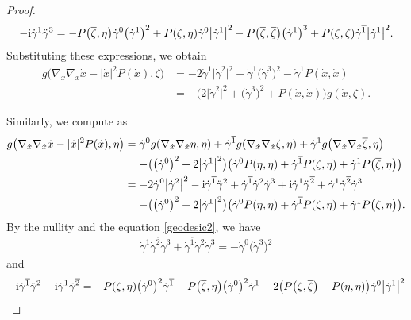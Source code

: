 \documentclass[11pt]{article}
\numberwithin{equation}{section}
\newcommand\ol{\overline}
\numberwithin{equation}{section}
\begin{document}
\begin{proof}
\begin{gather*}
-{\rm i}\dot\gamma^1\ddot\gamma^3=-P\bigl(\ol\zeta, \eta\bigr)\dot\gamma^0\bigl(\dot\gamma^1\bigr)^2+P(\zeta, \eta)\dot\gamma^0\bigl|\dot\gamma^{1}\bigr|^2
-P\bigl(\ol\zeta, \ol\zeta\bigr)\bigl(\dot\gamma^1\bigr)^3+P(\zeta, \zeta)\dot\gamma^{\ol1}\bigl|\dot\gamma^{1}\bigr|^2.
\end{gather*}
Substituting these expressions, we obtain
\begin{align*}
g\bigl(\nabla_{\dot x}\nabla_{\dot x}\dot x-|\dot x|^2P(\dot x) ,\zeta\bigr)
&=-2\dot\gamma^1\bigl|\dot\gamma^2\bigr|^2-\dot\gamma^1\bigl(\dot\gamma^3\bigr)^2-\dot\gamma^1P(\dot x, \dot x) \\
&=-\bigl(2\bigl|\dot\gamma^2\bigr|^2+\bigl(\dot\gamma^3\bigr)^2+P(\dot x, \dot x)\bigr)g(\dot x, \zeta).
\end{align*}

Similarly, we compute as
\begin{align*}
g\bigl(\nabla_{\dot x}\nabla_{\dot x}\dot x-|\dot x|^2P(\dot x) ,\eta\bigr)
={}&\dot\gamma^0g(\nabla_{\dot x}\nabla_{\dot x}\eta, \eta)+
\dot\gamma^{\ol1}g(\nabla_{\dot x}\nabla_{\dot x}\zeta, \eta)+\dot\gamma^1g\bigl(\nabla_{\dot x}\nabla_{\dot x}\ol\zeta, \eta\bigr) \\
&{}{-}\bigl(\bigl(\dot\gamma^0\bigr)^2+2\bigl|\dot\gamma^1\bigr|^2\bigr)\bigl(\dot\gamma^0P(\eta, \eta)+\dot\gamma^{\ol1}P(\zeta, \eta)+\dot\gamma^1P\bigl(\ol\zeta, \eta\bigr)\bigr) \\
={}&{-}2\dot\gamma^0\bigl|\dot\gamma^2\bigr|^2-{\rm i}\dot\gamma^{\ol1}\ddot\gamma^2
+\dot\gamma^{\ol1}\dot\gamma^2\dot\gamma^3+{\rm i}\dot\gamma^1\ddot\gamma^{\ol2}+\dot\gamma^1\dot\gamma^{\ol2}\dot\gamma^3 \\
&{}{-}\bigl(\bigl(\dot\gamma^0\bigr)^2+2\bigl|\dot\gamma^1\bigr|^2\bigr)\bigl(\dot\gamma^0P(\eta, \eta)+\dot\gamma^{\ol1}P(\zeta, \eta)+\dot\gamma^1P\bigl(\ol\zeta, \eta\bigr)\bigr).
\end{align*}
By the nullity and the equation \eqref{geodesic2}, we have
\begin{align*}
\dot\gamma^1\dot\gamma^{\ol2}\dot\gamma^3+\dot\gamma^{\ol1}\dot\gamma^2\dot\gamma^3 =-\dot\gamma^0\bigl(\dot\gamma^3\bigr)^2
\end{align*}
and
\begin{align*}
-{\rm i}\dot\gamma^{\ol1}\ddot\gamma^2+{\rm i}\dot\gamma^1\ddot\gamma^{\ol2}
={}&{-}P(\zeta, \eta)\bigl(\dot\gamma^0\bigr)^2\dot\gamma^{\ol1} -P\bigl(\ol\zeta, \eta\bigr)\bigl(\dot\gamma^0\bigr)^2\dot\gamma^1-2\bigl(P\bigl(\zeta, \ol\zeta\bigr)-P(\eta, \eta)\bigr)
\dot\gamma^0\bigl|\dot\gamma^1\bigr|^2\\

\end{align*}
\end{proof}
\end{document}
